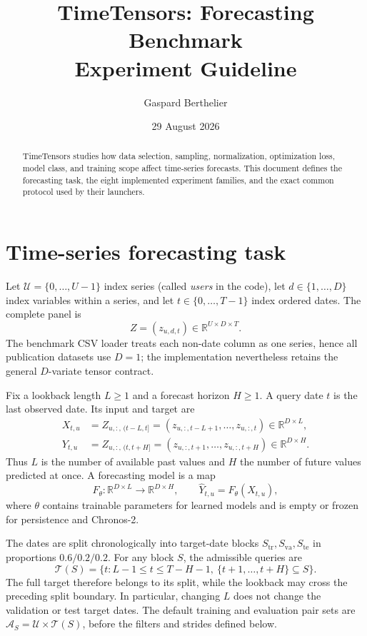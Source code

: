 \documentclass[10pt]{article}
\title{\vspace{-1.5em}\textbf{TimeTensors: Forecasting Benchmark}\\[2mm]\large Experiment Guideline\vspace{-0.4em}}
\author{Gaspard Berthelier}
\date{29 August 2026}
\newcommand{\reals}{\mathbb{R}}
\begin{document}
\maketitle
\thispagestyle{empty}

\begin{abstract}
TimeTensors studies how data selection, sampling, normalization, optimization
loss, model class, and training scope affect time-series forecasts. This
document defines the forecasting task, the eight implemented experiment
families, and the exact common protocol used by their launchers.
\end{abstract}

\tableofcontents

\section{Time-series forecasting task}
\label{sec:task}

Let $\mathcal U=\{0,\ldots,U-1\}$ index series (called \emph{users} in the
code), let $d\in\{1,\ldots,D\}$ index variables within a series, and let
$t\in\{0,\ldots,T-1\}$ index ordered dates. The complete panel is
\[
  Z=(z_{u,d,t})\in\reals^{U\times D\times T}.
\]
The benchmark CSV loader treats each non-date column as one series, hence all
publication datasets use $D=1$; the implementation nevertheless retains the
general $D$-variate tensor contract.

Fix a lookback length $L\geq1$ and a forecast horizon $H\geq1$. A query date
$t$ is the last observed date. Its input and target are
\begin{align}
  X_{t,u}
  &=Z_{u,:,\,(t-L,t]}
    =(z_{u,:,t-L+1},\ldots,z_{u,:,t})\in\reals^{D\times L},\\
  Y_{t,u}
  &=Z_{u,:,\,(t,t+H]}
    =(z_{u,:,t+1},\ldots,z_{u,:,t+H})\in\reals^{D\times H}.
\end{align}
Thus $L$ is the number of available past values and $H$ the number of future
values predicted at once. A forecasting model is a map
\[
  F_\theta:\reals^{D\times L}\longrightarrow\reals^{D\times H},
  \qquad \widehat Y_{t,u}=F_\theta(X_{t,u}),
\]
where $\theta$ contains trainable parameters for learned models and is empty or
frozen for persistence and Chronos-2.

The dates are split chronologically into target-date blocks
$S_{\mathrm{tr}},S_{\mathrm{va}},S_{\mathrm{te}}$ in proportions
$0.6/0.2/0.2$. For any block $S$, the admissible queries are
\[
  \mathcal T(S)=\{t:L-1\leq t\leq T-H-1,
  \ \{t+1,\ldots,t+H\}\subseteq S\}.
\]
The full target therefore belongs to its split, while the lookback may cross
the preceding split boundary. In particular, changing $L$ does not change the
validation or test target dates. The default training and evaluation pair sets
are $\mathcal A_S=\mathcal U\times\mathcal T(S)$, before the filters and strides
defined below.
\end{document}
